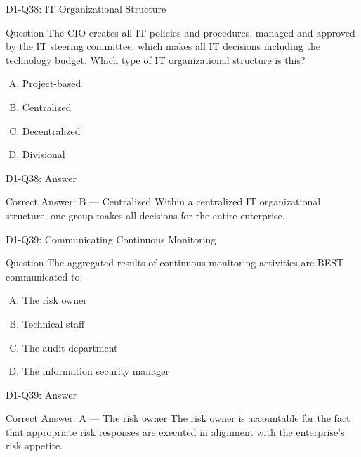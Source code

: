 \documentclass{beamer}
\begin{document}
	\begin{frame}{D1-Q38: IT Organizational Structure}
		\begin{block}{Question}
			The CIO creates all IT policies and procedures, managed and approved by the IT steering committee, which makes all IT decisions including the technology budget. Which type of IT organizational structure is this?
		\end{block}
		\begin{enumerate}[(A)]
			\item Project-based
			\item Centralized
			\item Decentralized
			\item Divisional
		\end{enumerate}
	\end{frame}
	\begin{frame}{D1-Q38: Answer}
		\begin{block}{Correct Answer: B --- Centralized}
			Within a centralized IT organizational structure, one group makes all decisions for the entire enterprise.
		\end{block}
	\end{frame}
	
	\begin{frame}{D1-Q39: Communicating Continuous Monitoring}
		\begin{block}{Question}
			The aggregated results of continuous monitoring activities are BEST communicated to:
		\end{block}
		\begin{enumerate}[(A)]
			\item The risk owner
			\item Technical staff
			\item The audit department
			\item The information security manager
		\end{enumerate}
	\end{frame}
	\begin{frame}{D1-Q39: Answer}
		\begin{block}{Correct Answer: A --- The risk owner}
			The risk owner is accountable for the fact that appropriate risk responses are executed in alignment with the enterprise's risk appetite.
		\end{block}
	\end{frame}
	
\end{document}

